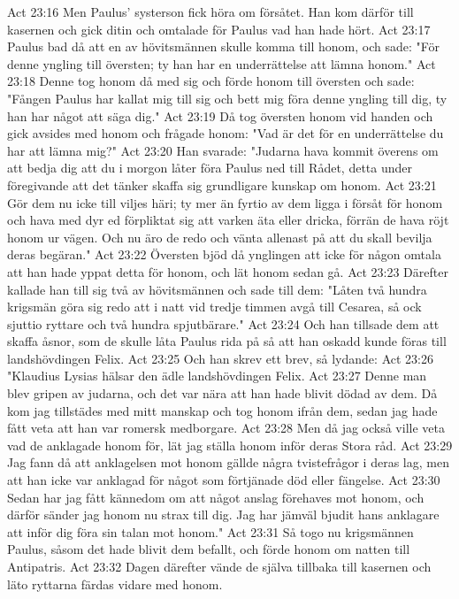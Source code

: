 Act 23:16  Men Paulus' systerson fick höra om försåtet. Han kom därför till kasernen och gick ditin och omtalade för Paulus vad han hade hört.
Act 23:17  Paulus bad då att en av hövitsmännen skulle komma till honom, och sade: "För denne yngling till översten; ty han har en underrättelse att lämna honom."
Act 23:18  Denne tog honom då med sig och förde honom till översten och sade: "Fången Paulus har kallat mig till sig och bett mig föra denne yngling till dig, ty han har något att säga dig."
Act 23:19  Då tog översten honom vid handen och gick avsides med honom och frågade honom: "Vad är det för en underrättelse du har att lämna mig?"
Act 23:20  Han svarade: "Judarna hava kommit överens om att bedja dig att du i morgon låter föra Paulus ned till Rådet, detta under föregivande att det tänker skaffa sig grundligare kunskap om honom.
Act 23:21  Gör dem nu icke till viljes häri; ty mer än fyrtio av dem ligga i försåt för honom och hava med dyr ed förpliktat sig att varken äta eller dricka, förrän de hava röjt honom ur vägen. Och nu äro de redo och vänta allenast på att du skall bevilja deras begäran."
Act 23:22  Översten bjöd då ynglingen att icke för någon omtala att han hade yppat detta för honom, och lät honom sedan gå.
Act 23:23  Därefter kallade han till sig två av hövitsmännen och sade till dem: "Låten två hundra krigsmän göra sig redo att i natt vid tredje timmen avgå till Cesarea, så ock sjuttio ryttare och två hundra spjutbärare."
Act 23:24  Och han tillsade dem att skaffa åsnor, som de skulle låta Paulus rida på så att han oskadd kunde föras till landshövdingen Felix.
Act 23:25  Och han skrev ett brev, så lydande:
Act 23:26  "Klaudius Lysias hälsar den ädle landshövdingen Felix.
Act 23:27  Denne man blev gripen av judarna, och det var nära att han hade blivit dödad av dem. Då kom jag tillstädes med mitt manskap och tog honom ifrån dem, sedan jag hade fått veta att han var romersk medborgare.
Act 23:28  Men då jag också ville veta vad de anklagade honom för, lät jag ställa honom inför deras Stora råd.
Act 23:29  Jag fann då att anklagelsen mot honom gällde några tvistefrågor i deras lag, men att han icke var anklagad för något som förtjänade död eller fängelse.
Act 23:30  Sedan har jag fått kännedom om att något anslag förehaves mot honom, och därför sänder jag honom nu strax till dig. Jag har jämväl bjudit hans anklagare att inför dig föra sin talan mot honom."
Act 23:31  Så togo nu krigsmännen Paulus, såsom det hade blivit dem befallt, och förde honom om natten till Antipatris.
Act 23:32  Dagen därefter vände de själva tillbaka till kasernen och läto ryttarna färdas vidare med honom.
